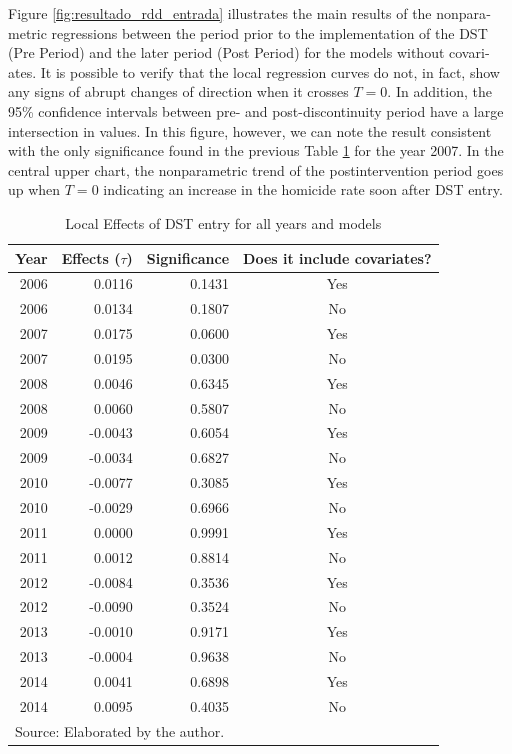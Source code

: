 \documentclass[12pt,openright,oneside,a4paper,english,french,spanish]{abntex2}
\numberwithin{table}{section} %
\numberwithin{figure}{section} %
\begin{document}
\begin{otherlanguage}{english}
Figure \ref{fig:resultado_rdd_entrada} illustrates the main results of the nonparametric regressions between the period prior to the implementation of the DST (Pre Period) and the later period (Post Period) for the models without covariates. It is possible to verify that the local regression curves do not, in fact, show any signs of abrupt changes of direction when it crosses $T=0$. In addition, the 95\% confidence intervals between pre- and post-discontinuity period have a large intersection in values. In this figure, however, we can note the result consistent with the only significance found in the previous Table \ref{tab:resultados_taus_entrada_RS} for the year 2007. In the central upper chart, the nonparametric trend of the postintervention period goes up when $T = 0$ indicating an increase in the homicide rate soon after DST entry.


\begin{table}[H]
\caption{Local Effects of DST entry for all years and models}
\begin{center}
\begin{small}
\begin{tabular}{rrrc}
  \hline
Year & Effects ($\tau$) & Significance & Does it include covariates? \\ 
  \hline
2006 & 0.0116 & 0.1431 & Yes \\ 
2006 & 0.0134 & 0.1807 & No \\ 
2007 & 0.0175 & 0.0600 & Yes \\ 
2007 & 0.0195 & 0.0300 & No \\ 
2008 & 0.0046 & 0.6345 & Yes \\ 
2008 & 0.0060 & 0.5807 & No \\ 
2009 & -0.0043 & 0.6054 & Yes \\ 
2009 & -0.0034 & 0.6827 & No \\ 
2010 & -0.0077 & 0.3085 & Yes \\ 
2010 & -0.0029 & 0.6966 & No \\ 
2011 & 0.0000 & 0.9991 & Yes \\ 
2011 & 0.0012 & 0.8814 & No \\ 
2012 & -0.0084 & 0.3536 & Yes \\ 
2012 & -0.0090 & 0.3524 & No \\ 
2013 & -0.0010 & 0.9171 & Yes \\ 
2013 & -0.0004 & 0.9638 & No \\ 
2014 & 0.0041 & 0.6898 & Yes \\ 
2014 & 0.0095 & 0.4035 & No \\
   \hline
\multicolumn{4}{l}{Source: Elaborated by the author.}
\end{tabular}
\end{small}
\end{center}
\label{tab:resultados_taus_entrada_RS}
\end{table}


\end{otherlanguage}
\end{document}
